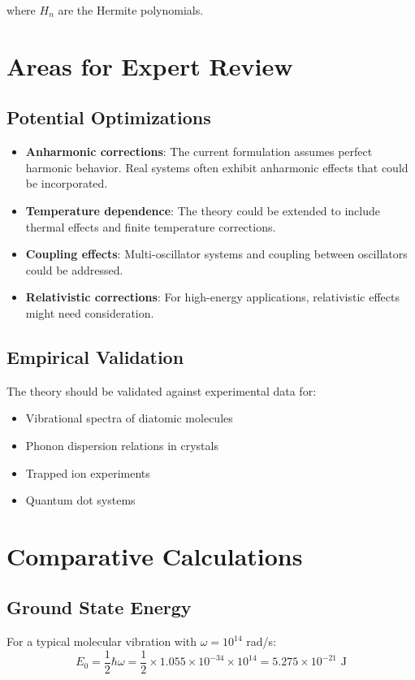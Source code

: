 \documentclass{article}
\begin{document}
where $H_n$ are the Hermite polynomials.

\section{Areas for Expert Review}

\subsection{Potential Optimizations}
\begin{itemize}
\item \textbf{Anharmonic corrections}: The current formulation assumes perfect harmonic behavior. Real systems often exhibit anharmonic effects that could be incorporated.
\item \textbf{Temperature dependence}: The theory could be extended to include thermal effects and finite temperature corrections.
\item \textbf{Coupling effects}: Multi-oscillator systems and coupling between oscillators could be addressed.
\item \textbf{Relativistic corrections}: For high-energy applications, relativistic effects might need consideration.
\end{itemize}

\subsection{Empirical Validation}
The theory should be validated against experimental data for:
\begin{itemize}
\item Vibrational spectra of diatomic molecules
\item Phonon dispersion relations in crystals
\item Trapped ion experiments
\item Quantum dot systems
\end{itemize}

\section{Comparative Calculations}

\subsection{Ground State Energy}
For a typical molecular vibration with $\omega = 10^{14}$ rad/s:
\begin{equation}
E_0 = \frac{1}{2}\hbar\omega = \frac{1}{2} \times 1.055 \times 10^{-34} \times 10^{14} = 5.275 \times 10^{-21} \text{ J}
\end{equation}
\end{document}
